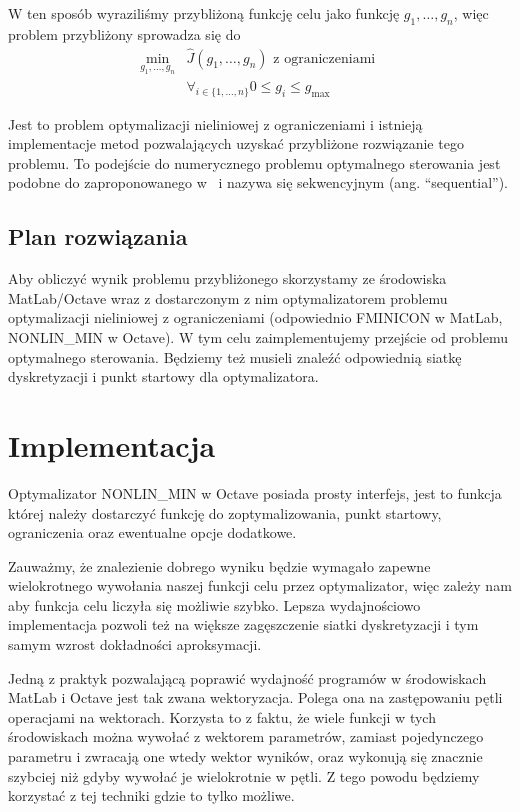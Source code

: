 \documentclass[11pt]{article}
\begin{document}
W ten sposób wyraziliśmy przybliżoną funkcję celu jako funkcję $g_1,\ldots,g_n$, więc problem przybliżony sprowadza się do
\begin{equation} \label{nlp}
  \begin{split}
    \min_{g_1,\ldots,g_n} &\hat{J}(g_1,\ldots, g_n) \text{ z ograniczeniami } \\
    &\forall_{i \in \{1,\ldots,n\}} 0 \le g_i \le g_{\max}
  \end{split}
\end{equation}

Jest to problem optymalizacji nieliniowej z ograniczeniami i istnieją implementacje metod pozwalających uzyskać przybliżone rozwiązanie tego problemu. To podejście do numerycznego problemu optymalnego sterowania jest podobne do zaproponowanego w~\cite{diehl} i nazywa się sekwencyjnym (ang. ``sequential''). 

\subsection{Plan rozwiązania}
Aby obliczyć wynik problemu przybliżonego skorzystamy ze środowiska MatLab/Octave wraz z dostarczonym z nim optymalizatorem problemu optymalizacji nieliniowej z ograniczeniami (odpowiednio FMINICON w MatLab, NONLIN\_MIN w Octave). W tym celu zaimplementujemy przejście od problemu optymalnego sterowania. Będziemy też musieli znaleźć odpowiednią siatkę dyskretyzacji i punkt startowy dla optymalizatora.

\section{Implementacja}
Optymalizator NONLIN\_MIN w Octave posiada prosty interfejs, jest to funkcja której należy dostarczyć funkcję do zoptymalizowania, punkt startowy, ograniczenia oraz ewentualne opcje dodatkowe.

Zauważmy, że znalezienie dobrego wyniku będzie wymagało zapewne wielokrotnego wywołania naszej funkcji celu przez optymalizator, więc zależy nam aby funkcja celu liczyła się możliwie szybko. Lepsza wydajnościowo implementacja pozwoli też na większe zagęszczenie siatki dyskretyzacji i tym samym wzrost dokładności aproksymacji.

Jedną z praktyk pozwalającą poprawić wydajność programów w środowiskach MatLab i Octave jest tak zwana wektoryzacja. Polega ona na zastępowaniu pętli operacjami na wektorach. Korzysta to z faktu, że wiele funkcji w tych środowiskach można wywołać z wektorem parametrów, zamiast pojedynczego parametru i zwracają one wtedy wektor wyników, oraz wykonują się znacznie szybciej niż gdyby wywołać je wielokrotnie w pętli. Z tego powodu będziemy korzystać z tej techniki gdzie to tylko możliwe.
\end{document}
